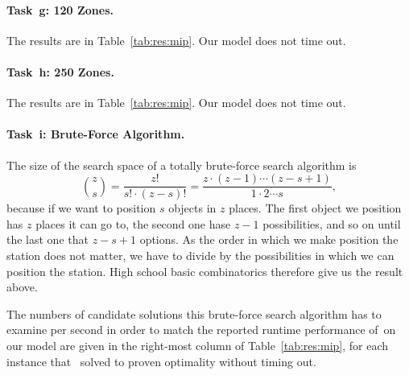 \paragraph{Task~g: 120 Zones.}
The results are in Table~\ref{tab:res:mip}.
%
Our model does not time out.

\paragraph{Task~h: 250 Zones.}
The results are in Table~\ref{tab:res:mip}.
%
Our model does not time out. %

\paragraph{Task~i: Brute-Force Algorithm.}
The size of the search space of a totally brute-force search algorithm
is 
\begin{equation*}
\binom{z}{s} = \frac{z!}{s! \cdot (z-s)!}  = \frac{z \cdot (z-1) \cdots (z-s+1)}{1 \cdot 2 \cdots s},
\end{equation*}
because if we want to position $s$ objects in $z$ places. The first object we position has $z$ places it can go to, the second one hase $z-1$ possibilities, and so on until the last one that $z - s + 1$ options. As the order in which we make position the station does not matter, we have to divide by the possibilities in which we can position the station. High school basic combinatorics therefore give us the result above.

The numbers of candidate solutions this brute-force search algorithm
has to examine per second in order to match the reported runtime
performance of~\SolverMIP on our model are given in the right-most
column of Table~\ref{tab:res:mip}, for each instance that~\SolverMIP
solved to proven optimality without timing out.
%

